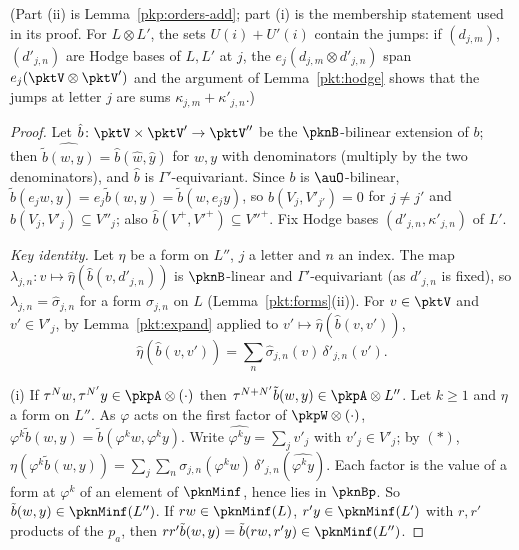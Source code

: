 \documentclass[10pt]{amsart}
\theoremstyle{definition}
\theoremstyle{remark}
\begin{document}
(Part (ii) is Lemma~\ref{pkp:orders-add}; part (i) is the membership statement used in its proof. For
$L\otimes L'$, the sets $U(i)+U'(i)$ contain the jumps: if $(d_{j,m})$, $(d'_{j,n})$ are Hodge bases of
$L,L'$ at $j$, the $e_j(d_{j,m}\otimes d'_{j,n})$ span $e_j(\pktV\otimes\pktV')$ and the argument of
Lemma~\ref{pkt:hodge} shows that the jumps at letter $j$ are sums $\kappa_{j,m}+\kappa'_{j,n}$.)

\begin{proof}
Let $\hat b\colon\pktV\times\pktV'\to\pktV''$ be the $\pknB$-bilinear extension of $b$; then
$\widehat{\tilde b(w,y)}=\hat b(\hat w,\hat y)$ for $w,y$ with denominators (multiply by the two
denominators), and $\hat b$ is $\Gamma'$-equivariant. Since $b$ is $\auO$-bilinear, $\tilde b(e_jw,y)=
e_j\tilde b(w,y)=\tilde b(w,e_jy)$, so $\hat b(V_j,V'_{j'})=0$ for $j\ne j'$ and $\hat b(V_j,V'_j)\subseteq
V''_j$; also $\hat b(V^+,V'^+)\subseteq V''^+$. Fix Hodge bases $(d'_{j,n},\kappa'_{j,n})$ of $L'$.

\emph{Key identity.} Let $\eta$ be a form on $L''$, $j$ a letter and $n$ an index. The map
$\lambda_{j,n}\colon v\mapsto\hat\eta(\hat b(v,d'_{j,n}))$ is $\pknB$-linear and $\Gamma'$-equivariant (as
$d'_{j,n}$ is fixed), so $\lambda_{j,n}=\hat\sigma_{j,n}$ for a form $\sigma_{j,n}$ on $L$ (Lemma~\ref{pkt:forms}(ii)).
For $v\in\pktV$ and $v'\in V'_j$, by Lemma~\ref{pkt:expand} applied to $v'\mapsto\hat\eta(\hat b(v,v'))$,
\[
\hat\eta(\hat b(v,v'))=\sum_n\hat\sigma_{j,n}(v)\,\delta'_{j,n}(v').\tag{$*$}
\]

(i) If $\tau^Nw,\tau^{N'}y\in\pkpA\otimes(\cdot)$ then $\tau^{N+N'}\tilde b(w,y)\in\pkpA\otimes L''$. Let
$k\ge1$ and $\eta$ a form on $L''$. As $\varphi$ acts on the first factor of $\pkpW\otimes(\cdot)$,
$\varphi^k\tilde b(w,y)=\tilde b(\varphi^kw,\varphi^ky)$. Write $\widehat{\varphi^ky}=\sum_jv'_j$ with
$v'_j\in V'_j$; by $(*)$,
$\eta(\varphi^k\tilde b(w,y))=\sum_j\sum_n\sigma_{j,n}(\varphi^kw)\,\delta'_{j,n}(\widehat{\varphi^k y})$. Each
factor is the value of a form at $\varphi^k$ of an element of $\pknMinf$, hence lies in $\pknBp$. So
$\tilde b(w,y)\in\pknMinf(L'')$. If $rw\in\pknMinf(L)$, $r'y\in\pknMinf(L')$ with $r,r'$ products of
the $p_a$, then $rr'\tilde b(w,y)=\tilde b(rw,r'y)\in\pknMinf(L'')$.


\end{proof}
\end{document}
